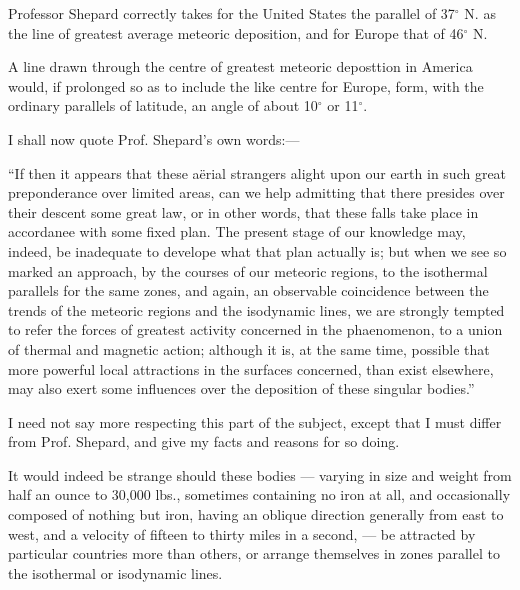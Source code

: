 \documentclass[a4paper, 12pt, oneside]{article}
\begin{document}
Professor Shepard correctly takes for the United States the parallel of 37$^\circ$ N. as the line of greatest average meteoric deposition, and for Europe that of 46$^\circ$ N.

A line drawn through the centre of greatest meteoric deposttion in America would, if prolonged so as to include the like centre for Europe, form, with the ordinary parallels of latitude, an angle of about 10$^\circ$ or 11$^\circ$.

I shall now quote Prof. Shepard's own words:---

``If then it appears that these aërial strangers alight upon our earth in such great preponderance over limited areas, can we help admitting that there presides over their descent some great law, or in other words, that these falls take place in accordanee with some fixed plan. The present stage of our knowledge may, indeed, be inadequate to develope what that plan actually is; but when we see so marked an approach, by the courses of our meteoric regions, to the isothermal parallels for the same zones, and again, an observable coincidence between the trends of the meteoric regions and the isodynamic lines, we are strongly tempted to refer the forces of greatest activity concerned in the phaenomenon, to a union of thermal and magnetic action; although it is, at the same time, possible that more powerful local attractions in the surfaces concerned, than exist elsewhere, may also exert some influences over the deposition of these singular bodies.''

I need not say more respecting this part of the subject, except that I must differ from Prof. Shepard, and give my facts and reasons for so doing.

It would indeed be strange should these bodies --- varying in size and weight from half an ounce to 30,000 lbs., sometimes containing no iron at all, and occasionally composed of nothing but iron, having an oblique direction generally from east to west, and a velocity of fifteen to thirty miles in a second, --- be attracted by particular countries more than others, or arrange themselves in zones parallel to the isothermal or isodynamic lines.
\end{document}
